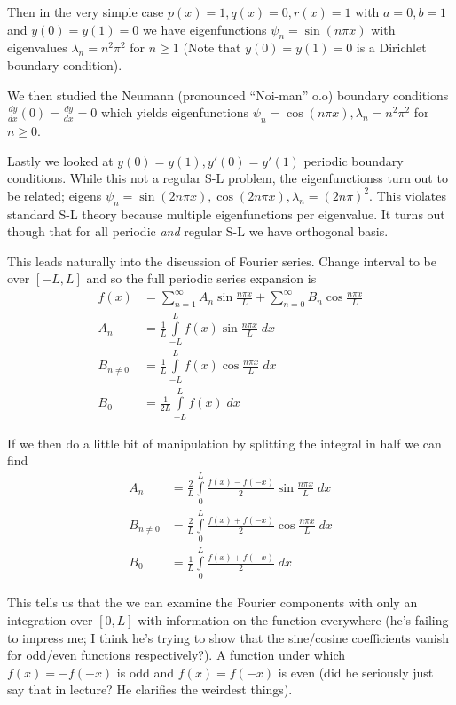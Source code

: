 \documentclass[10pt]{report}
\newcommand{\rd}[2]{\frac{d#1}{d#2}}
\begin{document}
Then in the very simple case $p(x) = 1, q(x) = 0, r(x) = 1$ with $a = 0, b = 1$ and $y(0) = y(1) = 0$ we have eigenfunctions $\psi_n  = \sin (n\pi x)$ with eigenvalues $\lambda_n = n^2\pi^2$ for $n \geq 1$ (Note that $y(0) = y(1) = 0$ is a Dirichlet boundary condition).

We then studied the Neumann (pronounced ``Noi-man'' o.o) boundary conditions $\rd{y}{x}(0) = \rd{y}{x} = 0$ which yields eigenfunctions $\psi_n = \cos(n\pi x), \lambda_n = n^2\pi^2$ for $n \geq 0$.

Lastly we looked at $y(0) = y(1), y'(0) = y'(1)$ periodic boundary conditions. While this not a regular S-L problem, the eigenfunctionss turn out to be related; eigens $\psi_n = \sin(2n\pi x), \cos(2n\pi x), \lambda_n = \left( 2n\pi \right)^2$. This violates standard S-L theory because multiple eigenfunctions per eigenvalue. It turns out though that for all periodic \emph{and} regular S-L we have orthogonal basis.

This leads naturally into the discussion of Fourier series. Change interval to be over $[-L,L]$ and so the full periodic series expansion is
\begin{align}
    f(x) &= \sum_{n=1}^{\infty}A_n\sin\frac{n\pi x}{L} + \sum_{n=0}^{\infty}B_n\cos\frac{n\pi x}{L}\\
    A_n &= \frac{1}{L}\displaystyle\int\limits_{-L}^{L}f(x) \sin \frac{n\pi x}{L}\;dx\\
    B_{n \neq 0} &= \frac{1}{L}\displaystyle\int\limits_{-L}^{L}f(x)\cos \frac{n\pi x}{L}\;dx\\
    B_0 &= \frac{1}{2L}\displaystyle\int\limits_{-L}^{L}f(x)\;dx
\end{align}

If we then do a little bit of manipulation by splitting the integral in half we can find
\begin{align}
    A_n &= \frac{2}{L}\displaystyle\int\limits_{0}^{L}\frac{f(x) - f(-x)}{2}\sin \frac{n\pi x}{L}\;dx\\
    B_{n \neq 0} &= \frac{2}{L}\displaystyle\int\limits_{0}^{L}\frac{f(x) + f(-x)}{2}\cos \frac{n\pi x}{L}\;dx\\
    B_0 &= \frac{1}{L}\displaystyle\int\limits_{0}^{L}\frac{f(x) + f(-x)}{2}\;dx
\end{align}

This tells us that the we can examine the Fourier components with only an integration over $[0,L]$ with information on the function everywhere (he's failing to impress me; I think he's trying to show that the sine/cosine coefficients vanish for odd/even functions respectively?). A function under which $f(x) = -f(-x)$ is odd and $f(x) = f(-x)$ is even (did he seriously just say that in lecture? He clarifies the weirdest things). 
\end{document}

